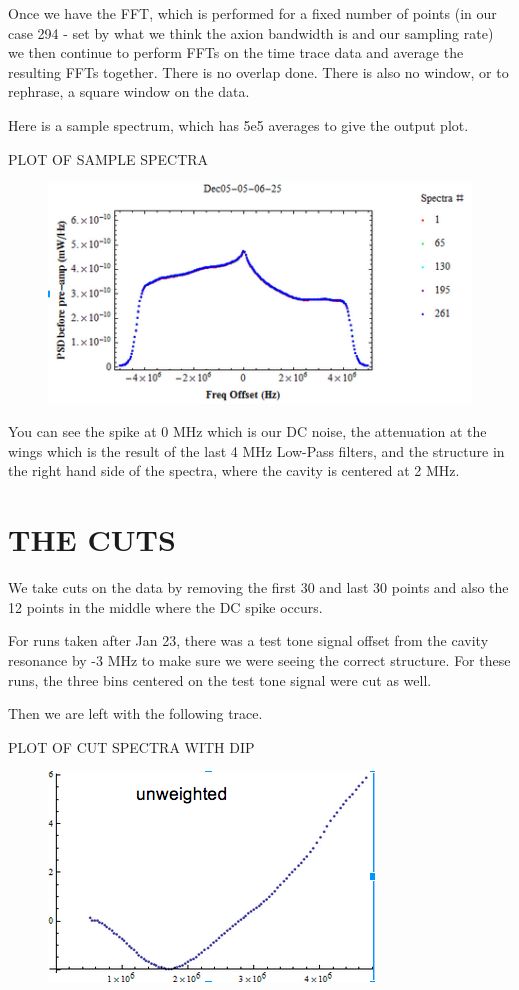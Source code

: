 \documentclass[11pt]{article}
\begin{document}
Once we have the FFT, which is performed for a fixed number of points (in our case 294 - set by what we think the axion bandwidth is and our sampling rate) we then continue to perform FFTs on the time trace data and average the resulting FFTs together. There is no overlap done. There is also no window, or to rephrase, a square window on the data.

Here is a sample spectrum, which has 5e5 averages to give the output plot.

PLOT OF SAMPLE SPECTRA
\begin{figure}
\includegraphics[scale=0.7]{samplespectrum}
\end{figure}

You can see the spike at 0 MHz which is our DC noise, the attenuation at the wings which is the result of the last 4 MHz Low-Pass filters, and the structure in the right hand side of the spectra, where the cavity is centered at 2 MHz. 

\section{THE CUTS}

We take cuts on the data by removing the first 30 and last 30 points and also the 12 points in the middle where the DC spike occurs.

For runs taken after Jan 23, there was a test tone signal offset from the cavity resonance by -3 MHz to make sure we were seeing the correct structure. For these runs, the three bins centered on the test tone signal were cut as well.

Then we are left with the following trace.

PLOT OF CUT SPECTRA WITH DIP
\begin{figure}
\includegraphics[scale=1]{dip}
\end{figure}
\end{document}

